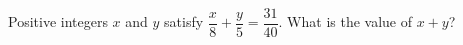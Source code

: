 Positive integers $x$ and $y$ satisfy $\dfrac {x}{8}+\dfrac {y}{5}=\dfrac{31}{40}$. What is the value of $x+y$?
